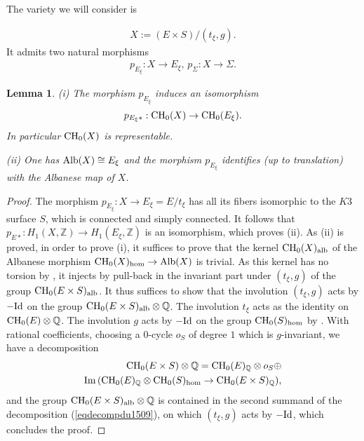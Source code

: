 \documentclass[10pt]{article}
\newtheorem{lemm}[theo]{Lemma}
\begin{document}
 The variety we will consider is

 \begin{eqnarray}\label{eqX} X:= (E\times S)/(t_\xi,g).\end{eqnarray}
 It admits two natural morphisms
 \begin{eqnarray}\label{eqtowmorph} p_{E_\xi}: X\rightarrow E_\xi,\,p_\Sigma: X\rightarrow \Sigma.\end{eqnarray}

 \begin{lemm}\label{lealbetchow} (i) The morphism $p_{E_\xi}$ induces an isomorphism
 $$ p_{E_\xi*}:{\rm CH}_0(X)\rightarrow  {\rm CH}_0(E_\xi).$$ In particular ${\rm CH}_0(X)$ is representable.

 (ii) One has ${\rm Alb}(X)\cong E_\xi$ and the morphism $p_{E_\xi}$ identifies (up to translation)  with the Albanese map of $X$.
 \end{lemm}

\begin{proof} The morphism $p_{E_\xi}: X\rightarrow E_\xi=E/t_\xi$ has all its fibers isomorphic to   the $K3$ surface $S$, which is connected and simply connected. It follows that $p_{E*}:H_1(X,\mathbb{Z})\rightarrow  H_1(E_\xi,\mathbb{Z})$ is an isomorphism, which proves (ii). As (ii) is proved, in order to prove  (i), it suffices to prove that   the kernel
${\rm CH}_0(X)_{\rm alb}$
 of the Albanese morphism
 ${\rm CH}_0(X)_{\rm hom}\rightarrow {\rm Alb}(X)$ is trivial.
 As this kernel has no torsion by \cite{roitmantorsion}, it injects by pull-back in the invariant part under $(t_\xi,g)$ of the group  ${\rm CH}_0(E\times S)_{\rm alb}$.
 It thus  suffices to show that the involution $(t_\xi,g)$ acts by $-{\rm Id}$ on the group  ${\rm CH}_0(E\times S)_{\rm alb}\otimes \mathbb{Q}$. The involution $t_\xi$ acts as the identity on ${\rm CH}_0(E)\otimes \mathbb{Q}$. The involution $g$ acts by $-{\rm Id}$ on the group ${\rm CH}_0(S)_{\rm hom}$ by \cite{blochkaslieberman}.
  With rational coefficients, choosing a $0$-cycle $o_S$ of degree $1$ which is $g$-invariant, we have a decomposition
  \begin{eqnarray}\label{eqdecompdu1509} {\rm CH}_0(E\times S)\otimes \mathbb{Q}={\rm CH}_0(E)_\mathbb{Q}\otimes o_S \oplus \\
  \nonumber
  {\rm Im}\,({\rm CH}_0(E)_\mathbb{Q}\otimes {\rm CH}_0(S)_{\rm hom}\rightarrow  {\rm CH}_0(E\times S)_\mathbb{Q}) ,\end{eqnarray}
  and the group ${\rm CH}_0(E\times S)_{\rm alb}\otimes \mathbb{Q}$ is contained in the second summand of the decomposition (\ref{eqdecompdu1509}), on which $(t_\xi,g)$ acts by $-{\rm Id}$,
  which concludes the proof.
\end{proof}
\end{document}
